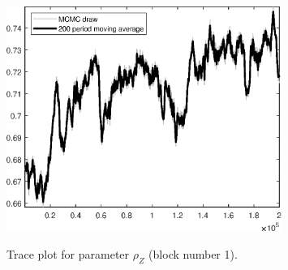\begin{figure}[H]
\centering
  \includegraphics[width=0.8\textwidth]{RBC_growth/graphs/TracePlot_rho_Z_blck_1}\\
    \caption{Trace plot for parameter ${\rho_Z}$ (block number 1).}
\end{figure}
